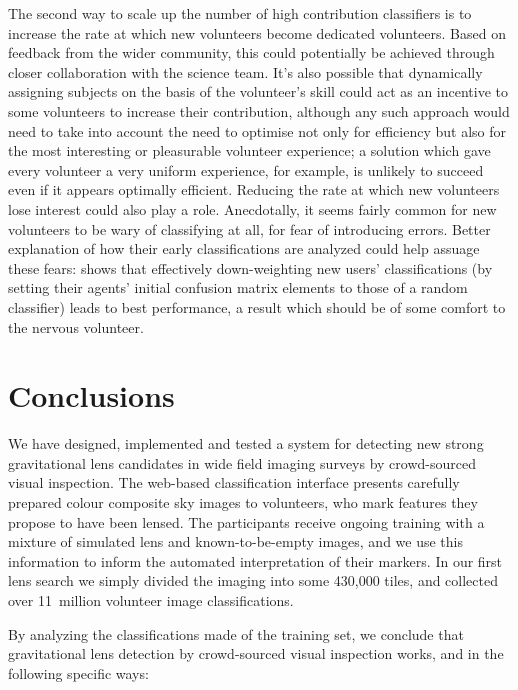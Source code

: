 \documentclass[useAMS,usenatbib,a4paper]{mn2e}
\begin{document}
The second way to scale up the number of high contribution classifiers is to
increase the rate at which new volunteers become dedicated volunteers. Based on
feedback from the wider \SW community, this could potentially be achieved
through closer collaboration with the science team. It's also possible that
dynamically assigning subjects on the basis of the volunteer's skill could act
as an incentive to some volunteers to increase their contribution, although any
such approach would need to take into account the need to optimise not only for efficiency but also for the most interesting or pleasurable volunteer experience; a solution which gave every volunteer a very uniform experience, for example, is unlikely to succeed even if it appears optimally efficient.  Reducing the
rate at which new volunteers lose interest could also play a role. Anecdotally,
it seems fairly common for new volunteers to be wary of classifying at all, for
fear of introducing errors. Better explanation of how their early
classifications are analyzed could help assuage these fears:
 shows that effectively down-weighting new users'
classifications (by setting their agents' initial confusion matrix elements to
those of a random classifier) leads to best performance, a result which should
be of some comfort to the nervous volunteer.




\section{Conclusions}
\label{sec:conclude}

We have designed, implemented and tested a system for   detecting new strong
gravitational lens candidates in wide field imaging surveys by crowd-sourced
visual inspection. The \SW web-based classification interface presents carefully
prepared colour composite sky images to volunteers, who mark features they
propose to  have been lensed. The participants receive ongoing training with a
mixture of simulated lens and known-to-be-empty images, and we use this
information to inform the automated interpretation of their markers. In our
first lens search we simply divided the \cfhtls imaging into some 430,000 tiles,
and collected over 11~million volunteer image classifications.

By analyzing the  classifications made of the training set, we conclude that
gravitational lens detection by crowd-sourced visual inspection works,  and in
the following specific ways:
\end{document}
